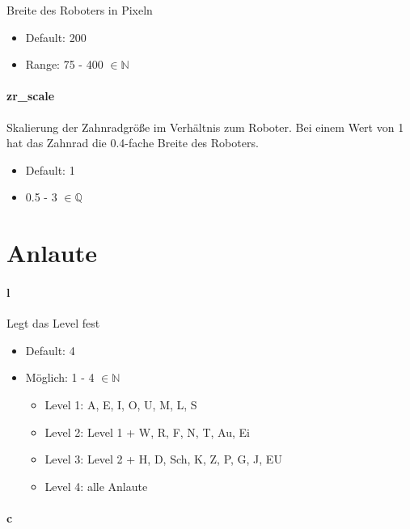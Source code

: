\documentclass[
  paper=a4,
  ,captions=tableheading
]{scrartcl}
\providecommand{\tightlist}{%
  \setlength{\itemsep}{0pt}\setlength{\parskip}{0pt}}
\begin{document}
Breite des Roboters in Pixeln

\begin{itemize}
\tightlist
\item
  Default: 200
\item
  Range: 75 - 400 \(\in \mathbb{N}\)
\end{itemize}

\hypertarget{zr_scale}{%
\paragraph{zr\_scale}\label{zr_scale}}

Skalierung der Zahnradgröße im Verhältnis zum Roboter. Bei einem Wert
von 1 hat das Zahnrad die 0.4-fache Breite des Roboters.

\begin{itemize}
\tightlist
\item
  Default: 1
\item
  0.5 - 3 \(\in \mathbb{Q}\)
\end{itemize}

\hypertarget{anlaute}{%
\section{Anlaute}\label{anlaute}}

\hypertarget{l}{%
\paragraph{l}\label{l}}

Legt das Level fest\\

\begin{itemize}
\tightlist
\item
  Default: 4
\item
  Möglich: 1 - 4 \(\in \mathbb{N}\)

  \begin{itemize}
  \tightlist
  \item
    Level 1: A, E, I, O, U, M, L, S
  \item
    Level 2: Level 1 + W, R, F, N, T, Au, Ei
  \item
    Level 3: Level 2 + H, D, Sch, K, Z, P, G, J, EU
  \item
    Level 4: alle Anlaute
  \end{itemize}
\end{itemize}

\hypertarget{c}{%
\paragraph{c}\label{c}}
\end{document}
